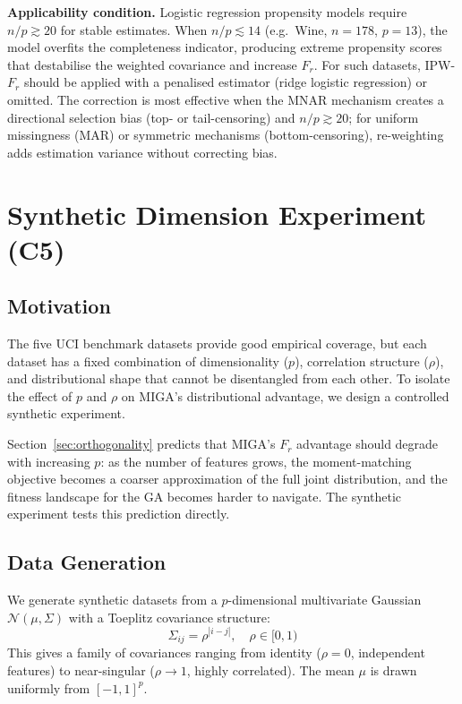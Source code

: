 \textbf{Applicability condition.} Logistic regression propensity models require
$n/p \gtrsim 20$ for stable estimates. When $n/p \lesssim 14$ (e.g.\ Wine,
$n=178$, $p=13$), the model overfits the completeness indicator, producing
extreme propensity scores that destabilise the weighted covariance and increase
$F_r$. For such datasets, IPW-$F_r$ should be applied with a penalised
estimator (ridge logistic regression) or omitted. The correction is most
effective when the MNAR mechanism creates a directional selection bias
(top- or tail-censoring) and $n/p \gtrsim 20$; for uniform missingness (MAR)
or symmetric mechanisms (bottom-censoring), re-weighting adds estimation
variance without correcting bias.



\section{Synthetic Dimension Experiment (C5)}
\label{sec:synthetic_dim_methods}

\subsection{Motivation}

The five UCI benchmark datasets provide good empirical coverage, but each dataset has a fixed combination of dimensionality ($p$), correlation structure ($\rho$), and distributional shape that cannot be disentangled from each other. To isolate the effect of $p$ and $\rho$ on MIGA's distributional advantage, we design a controlled synthetic experiment.

Section~\ref{sec:orthogonality} predicts that MIGA's $F_r$ advantage should degrade with increasing $p$: as the number of features grows, the moment-matching objective becomes a coarser approximation of the full joint distribution, and the fitness landscape for the GA becomes harder to navigate. The synthetic experiment tests this prediction directly.

\subsection{Data Generation}

We generate synthetic datasets from a $p$-dimensional multivariate Gaussian $\mathcal{N}(\mu, \Sigma)$ with a Toeplitz covariance structure:
\begin{equation}
    \Sigma_{ij} = \rho^{|i-j|}, \quad \rho \in [0, 1)
\end{equation}
This gives a family of covariances ranging from identity ($\rho = 0$, independent features) to near-singular ($\rho \to 1$, highly correlated). The mean $\mu$ is drawn uniformly from $[-1, 1]^p$.

